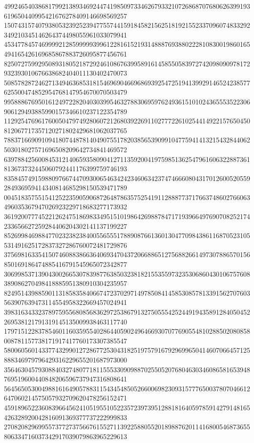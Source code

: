 \begin{DoxyCode}
      499246540386817992138934692447419850973346267933210726868707680626399193619650440995421676278409146698569257
      150743157407938053239252394775574415918458215625181921552337096074833292349210345146264374498055961033079941
      453477845746999921285999993996122816152193148887693880222810830019860165494165426169685867883726095877456761
      825072759929508931805218729246108676399589161458550583972742098090978172932393010676638682404011130402470073
      508578287246271349463685318154696904669686939254725194139929146524238577625500474852954768147954670070503479
      995888676950161249722820403039954632788306959762493615101024365553522306906129493885990157346610237122354789
      112925476961760050479749280607212680392269110277722610254414922157650450812067717357120271802429681062037765
      788371669091094180744878140490755178203856539099104775941413215432844062503018027571696508209642734841469572
      639788425600845312140659358090412711359200419759851362547961606322887361813673732445060792441176399759746193
      835845749159880976674470930065463424234606342374746660804317012600520559284936959414340814685298150539471789
      004518357551541252235905906872648786357525419112888773717663748602766063496035367947026923229718683277173932
      361920077745221262475186983349515101986426988784717193966497690708252174233656627259284406204302141137199227
      852699846988477023238238400556555178890876613601304770984386116870523105531491625172837327286760072481729876
      375698163354150746088386636406934704372066886512756882661497307886570156850169186474885416791545965072342877
      306998537139043002665307839877638503238182155355973235306860430106757608389086270498418885951380910304235957
      824951439885901131858358406674723702971497850841458530857813391562707603563907639473114554958322669457024941
      398316343323789759556808568362972538679132750555425244919435891284050452269538121791319145135009938463117740
      179715122837854601160359554028644059024964669307077690554810288502080858008781157738171917417760173307385547
      580060560143377432990127286772530431825197579167929699650414607066457125888346979796429316229655201687973000
      356463045793088403274807718115553309098870255052076804630346086581653948769519600440848206596737947316808641
      564565053004988161649057883115434548505266006982309315777650037807046612647060214575057932709620478256152471
      459189652236083966456241051955105223572397395128818164059785914279148165426328920042816091369377737222999833
      270820829699557377273756676155271139225880552018988762011416800546873655806334716037342917039079863965229613

\end{DoxyCode}
